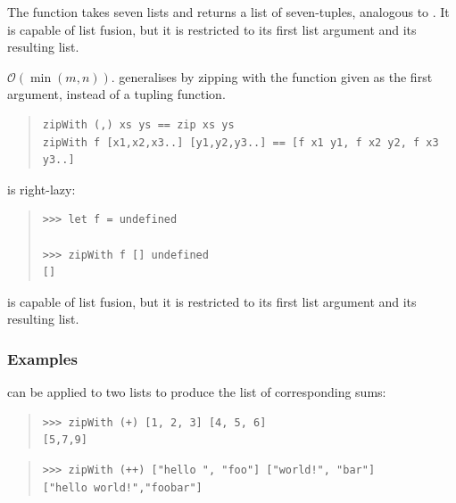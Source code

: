 \begin{haddockdesc}
\item[\begin{tabular}{@{}l}
zip7 :: {\char 91}a{\char 93} -> {\char 91}b{\char 93} -> {\char 91}c{\char 93} -> {\char 91}d{\char 93} -> {\char 91}e{\char 93} -> {\char 91}f{\char 93} -> {\char 91}g{\char 93} -> {\char 91}(a, b, c, d, e, f, g){\char 93}
\end{tabular}]
{\haddockbegindoc
The  function takes seven lists and returns a list of
 seven-tuples, analogous to .
 It is capable of list fusion, but it is restricted to its
 first list argument and its resulting list.\par}
\end{haddockdesc}
\begin{haddockdesc}
\item[\begin{tabular}{@{}l}
zipWith :: (a -> b -> c) -> {\char 91}a{\char 93} -> {\char 91}b{\char 93} -> {\char 91}c{\char 93}
\end{tabular}]
{\haddockbegindoc
\(\mathcal{O}(\min(m,n))\).  generalises  by zipping with the
 function given as the first argument, instead of a tupling function.\par
\begin{quote}
{\haddockverb\begin{verbatim}
zipWith (,) xs ys == zip xs ys
zipWith f [x1,x2,x3..] [y1,y2,y3..] == [f x1 y1, f x2 y2, f x3 y3..]\end{verbatim}}
\end{quote}
 is right-lazy:\par
\begin{quote}
{\haddockverb\begin{verbatim}
>>> let f = undefined

>>> zipWith f [] undefined
[]

\end{verbatim}}
\end{quote}
 is capable of list fusion, but it is restricted to its
 first list argument and its resulting list.\par
\subsubsection*{\textbf{Examples}}
 can be applied to two lists to produce the list of
 corresponding sums:\par
\begin{quote}
{\haddockverb\begin{verbatim}
>>> zipWith (+) [1, 2, 3] [4, 5, 6]
[5,7,9]

\end{verbatim}}
\end{quote}
\begin{quote}
{\haddockverb\begin{verbatim}
>>> zipWith (++) ["hello ", "foo"] ["world!", "bar"]
["hello world!","foobar"]

\end{verbatim}}
\end{quote}}
\end{haddockdesc}
